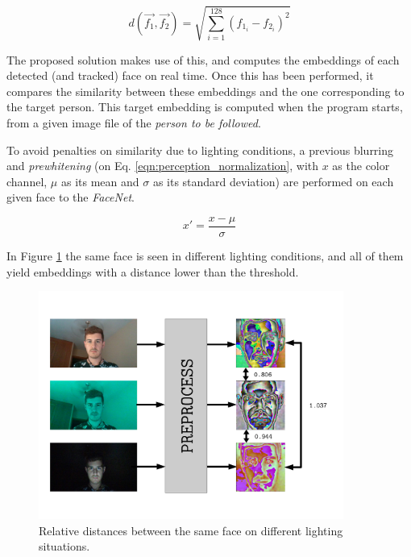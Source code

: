 \begin{equation}
d(\vec{f_1}, \vec{f_2}) = \sqrt{\sum_{i=1}^{128}(f_{1_i} - f_{2_i})^2}
\label{eqn:eucl_distance}
\end{equation}

The proposed solution makes use of this, and computes the embeddings of each detected (and tracked) face on real time. Once this has been performed, it compares the similarity between these embeddings and the one corresponding to the target person. This target embedding is computed when the program starts, from a given image file of the \emph{person to be followed}.

To avoid penalties on similarity due to lighting conditions, a previous blurring and \emph{prewhitening} (on Eq. \ref{eqn:perception_normalization}, with $x$ as the color channel, $\mu$ as its mean and $\sigma$ as its standard deviation) are performed on each given face to the \emph{FaceNet}.

\begin{equation}
x' = \frac{x - \mu}{\sigma}
\label{eqn:perception_normalization}
\end{equation}

In Figure \ref{fig:perception_distance} the same face is seen in different lighting conditions, and all of them yield embeddings with a distance lower than the threshold.

\begin{figure}[h]
	\centering
	\includegraphics[width=10cm]{images/facenet_prewhiten}
	\caption{Relative distances between the same face on different lighting situations.}
        \label{fig:perception_distance}
\end{figure}





